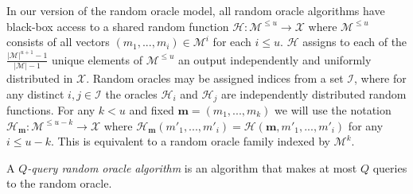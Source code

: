 \begin{definition}
	In our version of the random oracle model, all random oracle algorithms have black-box access to a shared random function $\mathcal{H}: \mathcal{M}^{\leq u} \rightarrow \mathcal{X}$ where $\mathcal{M}^{\leq u}$ consists of all vectors $(m_1,...,m_i) \in \mathcal{M}^i$ for each $i \leq u$. $\mathcal{H}$ assigns to each of the $\frac{|\mathcal{M}|^{u + 1} - 1}{|\mathcal{M}| - 1}$ unique elements of $\mathcal{M}^{\leq u}$ an output independently and uniformly distributed in $\mathcal{X}$. Random oracles may be assigned indices from a set $\mathcal{I}$, where for any distinct $i,j \in \mathcal{I}$ the oracles $\mathcal{H}_i$ and $\mathcal{H}_j$ are independently distributed random functions. For any $k < u$ and fixed $\mathbf{m} = (m_1,...,m_k)$ we will use the notation $\mathcal{H}_\mathbf{m}: \mathcal{M}^{\leq u - k} \rightarrow \mathcal{X}$ where $\mathcal{H}_\mathbf{m}(m'_1,...,m'_i) = \mathcal{H}(\mathbf{m}, m'_1,...,m'_i)$ for any $i \leq u - k$. This is equivalent to a random oracle family indexed by $\mathcal{M}^k$. 
\end{definition}
A \emph{$Q$-query random oracle algorithm} is an algorithm that makes at most $Q$ queries to the random oracle. 


